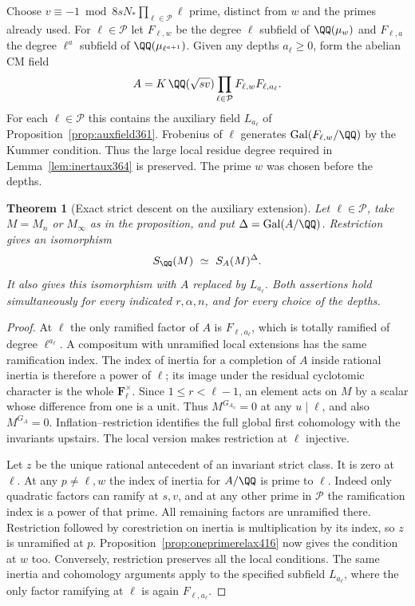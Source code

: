 \documentclass[a4paper,11pt]{article}
\newtheorem{theorem}[proposition]{Theorem}
\theoremstyle{definition}
\theoremstyle{remark}
\numberwithin{equation}{section}
\begin{document}
Choose \(v\equiv-1\bmod 8sN_*\prod_{\ell\in\mathcal P}\ell\)
prime, distinct from \(w\) and the primes already used.
For \(\ell\in\mathcal P\) let \(F_{\ell,w}\) be the degree
\(\ell\) subfield of \(\QQ(\mu_w)\) and \(F_{\ell,a}\) the
degree \(\ell^a\) subfield of \(\QQ(\mu_{\ell^{a+1}})\).
Given any depths \(a_\ell\ge0\), form the abelian CM field
\[
 A=K\,\QQ(\sqrt{sv})\prod_{\ell\in\mathcal P}
                       F_{\ell,w}F_{\ell,a_\ell}.
\]
For each \(\ell\in\mathcal P\) this contains the auxiliary field
\(L_{a_\ell}\) of Proposition~\ref{prop:auxfield361}. Frobenius
of \(\ell\) generates \(\operatorname{Gal}(F_{\ell,w}/\QQ)\)
by the Kummer condition. Thus the large local residue degree
required in Lemma~\ref{lem:inertaux364} is preserved. The prime
\(w\) was chosen before the depths.

\begin{theorem}[Exact strict descent on the auxiliary extension]\leavevmode
\label{thm:strictbasedescent416}
Let \(\ell\in\mathcal P\), take \(M=M_n\) or \(M_\infty\) as in
the proposition, and put \(\Delta=\operatorname{Gal}(A/\QQ)\).
Restriction gives an isomorphism
\[
                   S_\QQ(M)\ \simeq\ S_A(M)^\Delta .
\]
It also gives this isomorphism with \(A\) replaced by
\(L_{a_\ell}\). Both assertions hold simultaneously for every
indicated \(r,\alpha,n\), and for every choice of the depths.
\end{theorem}
\begin{proof}
At \(\ell\) the only ramified factor of \(A\) is
\(F_{\ell,a_\ell}\), which is totally ramified of degree
\(\ell^{a_\ell}\). A compositum with unramified local
extensions has the same ramification index. The index of
inertia for a completion of \(A\) inside rational inertia is
therefore a power of \(\ell\); its image under the residual
cyclotomic character is the whole \(\mathbf F_\ell^\times\).
Since \(1\le r<\ell-1\), an element acts on \(M\) by a scalar
whose difference from one is a unit. Thus \(M^{G_{A_u}}=0\)
at any \(u\mid\ell\), and also \(M^{G_A}=0\).
Inflation--restriction identifies the full global first
cohomology with the invariants upstairs. The local version
makes restriction at \(\ell\) injective.

Let \(z\) be the unique rational antecedent of an invariant
strict class. It is zero at \(\ell\). At any \(p\ne\ell,w\)
the index of inertia for \(A/\QQ\) is prime to \(\ell\).
Indeed only quadratic factors can ramify at \(s,v\), and
at any other prime in \(\mathcal P\) the ramification index
is a power of that prime. All remaining factors are unramified
there. Restriction followed by corestriction on inertia is
multiplication by its index, so \(z\) is unramified at \(p\).
Proposition~\ref{prop:oneprimerelax416} now gives the condition
at \(w\) too. Conversely, restriction preserves all the local
conditions. The same inertia and cohomology arguments apply
to the specified subfield \(L_{a_\ell}\), where the only
factor ramifying at \(\ell\) is again \(F_{\ell,a_\ell}\).
\end{proof}
\end{document}
